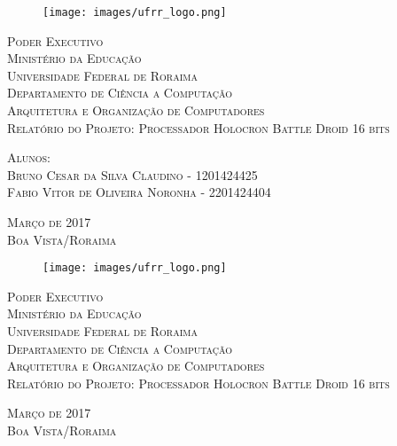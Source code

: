 \documentclass{article}
\newenvironment{bottompar}{\par\vspace*{\fill}}{\clearpage}
\newcommand\tab[1][0.50cm]{\hspace*{#1}}
\begin{document}
	
	
	\begin{titlepage}
		\begin{center}
			\begin{figure}[H]
				\centering
				\texttt{[image: images/ufrr\_logo.png]}
			\end{figure}
			\textsc{\large Poder Executivo}\\
			\textsc{\large Minist\'{e}rio da Educa\c{c}\~{a}o}\\
			\textsc{\large Universidade Federal de Roraima}\\
			\textsc{\large Departamento de Ci\^{e}ncia a Computa\c{c}\~{a}o}\\
			[2in]			
			\textsc{\large Arquitetura e Organiza\c{c}\~{a}o de Computadores}\\
			[1in]			
			\textsc{\large Relat\'{o}rio do Projeto: Processador Holocron Battle Droid 16 bits}\\
			[1.5in]
			\begin{flushleft}
				\textsc{\large Alunos:}\\
				\textsc{\large 	\tab Bruno Cesar da Silva Claudino  - 1201424425\\
								\tab Fabio Vitor de Oliveira Noronha - 2201424404}
			\end{flushleft}
			\begin{bottompar}
				\textsc{\large Mar\c{c}o de 2017 \\ Boa Vista/Roraima}
			\end{bottompar}
		\end{center}
	\end{titlepage}
	\begin{center}
		\thispagestyle{empty}
		\begin{figure}[H]
			\centering
			\texttt{[image: images/ufrr\_logo.png]}
		\end{figure}
		\textsc{\large Poder Executivo}\\
		\textsc{\large Minist\'{e}rio da Educa\c{c}\~{a}o}\\
		\textsc{\large Universidade Federal de Roraima}\\
		\textsc{\large Departamento de Ci\^{e}ncia a Computa\c{c}\~{a}o}\\
		[2in]			
		\textsc{\large Arquitetura e Organiza\c{c}\~{a}o de Computadores}\\
		[1in]			
		\textsc{\large Relat\'{o}rio do Projeto: Processador Holocron Battle Droid 16 bits}\\
		
		\begin{bottompar}
			\textsc{\large Mar\c{c}o de 2017 \\ Boa Vista/Roraima}
		\end{bottompar}
	\end{center}
	\cleardoublepage
	
\end{document}
